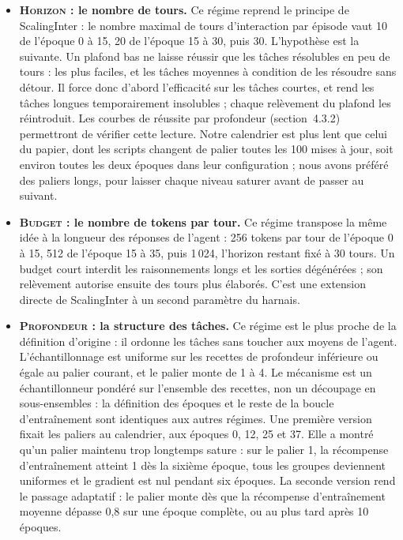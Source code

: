 \documentclass[11pt,a4paper]{article}
\begin{document}
\begin{itemize}
    \item \textbf{\textsc{Horizon} : le nombre de tours.} Ce régime reprend le principe de ScalingInter : le nombre maximal de tours d'interaction par épisode vaut 10 de l'époque 0 à 15, 20 de l'époque 15 à 30, puis 30. L'hypothèse est la suivante. Un plafond bas ne laisse réussir que les tâches résolubles en peu de tours : les plus faciles, et les tâches moyennes à condition de les résoudre sans détour. Il force donc d'abord l'efficacité sur les tâches courtes, et rend les tâches longues temporairement insolubles ; chaque relèvement du plafond les réintroduit. Les courbes de réussite par profondeur (section~4.3.2) permettront de vérifier cette lecture. Notre calendrier est plus lent que celui du papier, dont les scripts changent de palier toutes les 100 mises à jour, soit environ toutes les deux époques dans leur configuration ; nous avons préféré des paliers longs, pour laisser chaque niveau saturer avant de passer au suivant.
    \item \textbf{\textsc{Budget} : le nombre de tokens par tour.} Ce régime transpose la même idée à la longueur des réponses de l'agent : 256 tokens par tour de l'époque 0 à 15, 512 de l'époque 15 à 35, puis 1\,024, l'horizon restant fixé à 30 tours. Un budget court interdit les raisonnements longs et les sorties dégénérées ; son relèvement autorise ensuite des tours plus élaborés. C'est une extension directe de ScalingInter à un second paramètre du harnais.
    \item \textbf{\textsc{Profondeur} : la structure des tâches.} Ce régime est le plus proche de la définition d'origine : il ordonne les tâches sans toucher aux moyens de l'agent. L'échantillonnage est uniforme sur les recettes de profondeur inférieure ou égale au palier courant, et le palier monte de 1 à 4. Le mécanisme est un échantillonneur pondéré sur l'ensemble des recettes, non un découpage en sous-ensembles : la définition des époques et le reste de la boucle d'entraînement sont identiques aux autres régimes. Une première version fixait les paliers au calendrier, aux époques 0, 12, 25 et 37. Elle a montré qu'un palier maintenu trop longtemps sature : sur le palier 1, la récompense d'entraînement atteint 1 dès la sixième époque, tous les groupes deviennent uniformes et le gradient est nul pendant six époques. La seconde version rend le passage adaptatif : le palier monte dès que la récompense d'entraînement moyenne dépasse 0{,}8 sur une époque complète, ou au plus tard après 10 époques.
\end{itemize}
\end{document}
